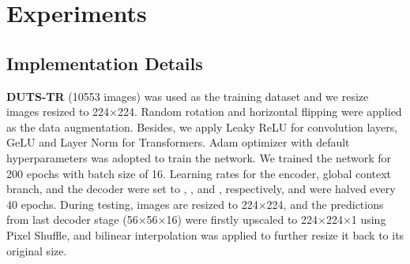 \documentclass[letterpaper]{article} \usepackage{aaai22}  \usepackage{times}  \usepackage{helvet}  \usepackage{courier}  \usepackage[hyphens]{url}  \usepackage{graphicx} \urlstyle{rm} \def\UrlFont{\rm}  \usepackage{natbib}  \usepackage{caption} \DeclareCaptionStyle{ruled}{labelfont=normalfont,labelsep=colon,strut=off} \frenchspacing  \setlength{\pdfpagewidth}{8.5in}  \setlength{\pdfpageheight}{11in}  \usepackage{algorithm}
\begin{document}
\section{Experiments}
\subsection{Implementation Details}
\textbf{DUTS-TR} \cite{DUTSTE}(10553 images) was used as the training dataset and we resize images resized to 224×224. Random  rotation and horizontal flipping were applied as the data augmentation. Besides, we apply Leaky ReLU \cite{LEAKY} for convolution layers, GeLU \cite{GELU} and Layer Norm \cite{LN} for Transformers. Adam optimizer \cite{ADAM} with default hyperparameters was adopted to train the network. We trained the network for 200 epochs with batch size of 16. Learning rates for the encoder, global context branch, and the decoder were set to , , and , respectively, and were halved every 40 epochs. During testing, images are resized to 224×224, and the predictions from last decoder stage (56×56×16) were firstly upscaled to 224×224×1 using Pixel Shuffle, and bilinear interpolation was applied to further resize it back to its original size.
\end{document}
